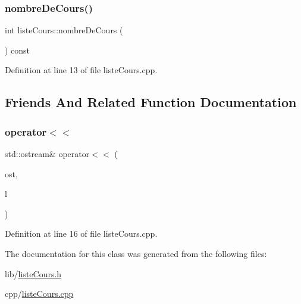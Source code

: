 \subsubsection{\texorpdfstring{nombre\+De\+Cours()}{nombreDeCours()}}
{\footnotesize\ttfamily int liste\+Cours\+::nombre\+De\+Cours (\begin{DoxyParamCaption}{ }\end{DoxyParamCaption}) const}



Definition at line 13 of file liste\+Cours.\+cpp.



\subsection{Friends And Related Function Documentation}
\hypertarget{classliste_cours_a78ee4cc125386ff5f709ea4ec9438f69}{}\label{classliste_cours_a78ee4cc125386ff5f709ea4ec9438f69} 
\subsubsection{\texorpdfstring{operator$<$$<$}{operator<<}}
{\footnotesize\ttfamily std\+::ostream\& operator$<$$<$ (\begin{DoxyParamCaption}\item[{std\+::ostream \&}]{ost,  }\item[{const \hyperlink{classliste_cours}{liste\+Cours} \&}]{l }\end{DoxyParamCaption})\hspace{0.3cm}{\ttfamily [friend]}}



Definition at line 16 of file liste\+Cours.\+cpp.



The documentation for this class was generated from the following files\+:\begin{DoxyCompactItemize}
\item 
lib/\hyperlink{liste_cours_8h}{liste\+Cours.\+h}\item 
cpp/\hyperlink{liste_cours_8cpp}{liste\+Cours.\+cpp}\end{DoxyCompactItemize}
